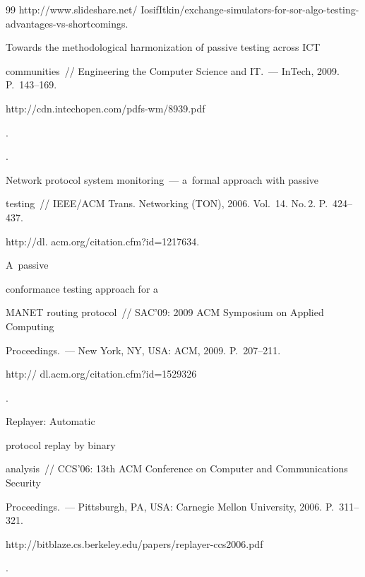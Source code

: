 {{\begin{thebibliography}{99}
{\sf http://www.slideshare.net/ IosifItkin/exchange-simulators-for-sor-algo-testing-advantages-vs-shortcomings}.







 Towards the methodological harmonization of passive testing across ICT


communities~/\!\!/ Engineering the Computer Science and IT.~--- InTech, 2009. P.~143--169. {\sf


http://cdn.intechopen.com/pdfs-wm/8939.pdf}.







.


Network protocol system monitoring~--- a~formal approach with passive


testing~/\!\!/ IEEE/ACM Trans. Networking (TON), 2006. Vol.~14. No.\,2. P.~424--437.


{\sf http://dl. acm.org/citation.cfm?id=1217634}.







 A~passive


conformance testing approach for a


MANET routing protocol~/\!\!/ SAC'09: 2009 ACM Symposium on Applied Computing


Proceedings.~--- New York, NY, USA: ACM, 2009. P.~207--211. {\sf


http:// dl.acm.org/citation.cfm?id=1529326}.







 Replayer: Automatic


protocol replay by binary


analysis~/\!\!/ CCS'06:  13th ACM Conference on Computer and Communications Security


Proceedings.~--- Pittsburgh, PA, USA: Carnegie Mellon University, 2006. P.~311--321. {\sf


http://bitblaze.cs.berkeley.edu/papers/replayer-ccs2006.pdf}.






\end{thebibliography}}}
